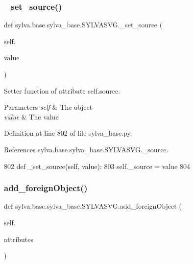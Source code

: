 \subsubsection{\texorpdfstring{\+\_\+set\+\_\+source()}{\_set\_source()}}
{\footnotesize\ttfamily def sylva.\+base.\+sylva\+\_\+base.\+S\+Y\+L\+V\+A\+S\+V\+G.\+\_\+set\+\_\+source (\begin{DoxyParamCaption}\item[{}]{self,  }\item[{}]{value }\end{DoxyParamCaption})\hspace{0.3cm}{\ttfamily [private]}}



Setter function of attribute self.\+source. 


\begin{DoxyParams}{Parameters}
{\em self} & The object \\
\hline
{\em value} & The value \\
\hline
\end{DoxyParams}


Definition at line 802 of file sylva\+\_\+base.\+py.



References sylva.\+base.\+sylva\+\_\+base.\+S\+Y\+L\+V\+A\+S\+V\+G.\+\_\+source.


\begin{DoxyCode}
802     \textcolor{keyword}{def }\_set\_source(self, value):
803         self.\_source = value
804 
\end{DoxyCode}
\mbox{\label{classsylva_1_1base_1_1sylva__base_1_1_s_y_l_v_a_s_v_g_acc461814ddb36c877415dde5ba29d49b}} 
\subsubsection{\texorpdfstring{add\+\_\+foreign\+Object()}{add\_foreignObject()}}
{\footnotesize\ttfamily def sylva.\+base.\+sylva\+\_\+base.\+S\+Y\+L\+V\+A\+S\+V\+G.\+add\+\_\+foreign\+Object (\begin{DoxyParamCaption}\item[{}]{self,  }\item[{}]{attributes }\end{DoxyParamCaption})}



